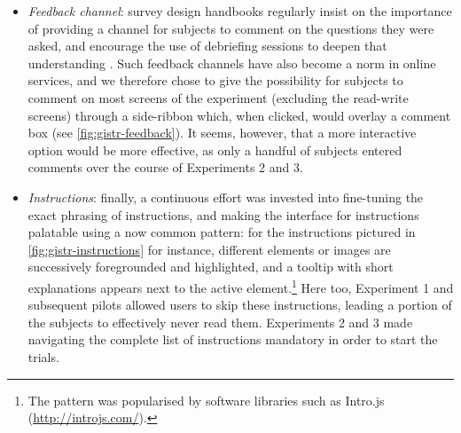 \begin{itemize}
  several mistakes that worsened the inherent pressure on subjects to
  complete the study as fast as possible (indeed, payment on Prolific
  Academic is per experiment, not per time spent -- which, conversely,
  would encourage subjects to be very slow). First, subjects could
  terminate the reading time of an utterance at will. While this
  provided a measure of the effective reading time used by subjects, it
  also opened the possibility of speeding through the trials. Indeed
  over a third of the transformations of Experiment 1 were done by using
  less than half the allotted reading time. This pressure was increased
  by the presence of a \enquote{remaining time} clock in the reading and
  waiting phases, similar to the green clock shown on
  \cref{fig:gistr-instructions} for the writing phase. By removing
  superfluous clocks, keeping the reading time fixed, and proposing a
  break after each utterance, Experiments 2 and 3 relaxed the time
  pressure on the subjects and improved the final data quality.
\item
  \emph{Feedback channel}: survey design handbooks regularly insist on
  the importance of providing a channel for subjects to comment on the
  questions they were asked, and encourage the use of debriefing
  sessions to deepen that understanding
  \autocite{de_leeuw_international_2008}. Such feedback channels have
  also become a norm in online services, and we therefore chose to give
  the possibility for subjects to comment on most screens of the
  experiment (excluding the read-write screens) through a side-ribbon
  which, when clicked, would overlay a comment box (see
  \cref{fig:gistr-feedback}). It seems, however, that a more interactive
  option would be more effective, as only a handful of subjects entered
  comments over the course of Experiments 2 and 3.
\item
  \emph{Instructions}: finally, a continuous effort was invested into
  fine-tuning the exact phrasing of instructions, and making the
  interface for instructions palatable using a now common pattern: for
  the instructions pictured in \cref{fig:gistr-instructions} for
  instance, different elements or images are successively foregrounded
  and highlighted, and a tooltip with short explanations appears next to
  the active element.\footnote{The pattern was popularised by software
    libraries such as Intro.js (\url{http://introjs.com/}).} Here too,
  Experiment 1 and subsequent pilots allowed users to skip these
  instructions, leading a portion of the subjects to effectively never
  read them. Experiments 2 and 3 made navigating the complete list of
  instructions mandatory in order to start the trials.
\end{itemize}

